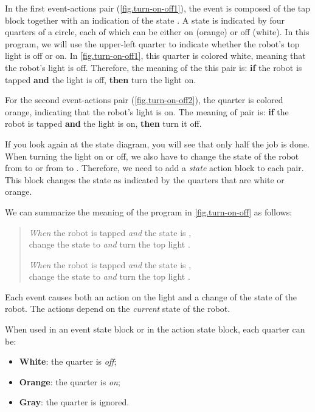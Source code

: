 In the first event-actions pair (\cref{fig.turn-on-off1}), the event is
composed of the tap block together with an indication of the state
. A state is indicated by four quarters of a circle,
each of which can be either on (orange) or off (white). In this program,
we will use the upper-left quarter to indicate whether the robot's top
light is off or on. In \cref{fig.turn-on-off1}, this quarter is colored
white, meaning that the robot's light is off. Therefore, the meaning of
the this pair is: \textbf{if} the robot is tapped \textbf{and} the light
is off, \textbf{then} turn the light on.

For the second event-actions pair (\cref{fig.turn-on-off2}), the quarter
is colored orange, indicating that the robot's light is on. The meaning
of pair is: \textbf{if} the robot is tapped \textbf{and} the light is
on, \textbf{then} turn it off.

If you look again at the state diagram, you will see that only half the
job is done. When turning the light on or off, we also have to change
the state of the robot from  to  or from  to
. Therefore, we need to add a \emph{state} action block
 to each pair. This block changes the state as
indicated by the quarters that are white or orange.

We can summarize the meaning of the program in \cref{fig.turn-on-off}
as follows:

\begin{quote}
\emph{When} the robot is tapped \emph{and} the state is ,\\
change the state to  \emph{and} turn the top light .

\emph{When} the robot is tapped \emph{and} the state is ,\\
change the state to  \emph{and} turn the top light .
\end{quote}

Each event causes both an action on the light and a change of the state
of the robot. The actions depend on the \emph{current} state of the robot.


When used in an event state block or in the action state block, each quarter can be:
\begin{itemize}
\item \textbf{White}: the quarter is \emph{off};
\item \textbf{Orange}: the quarter is \emph{on};
\item \textbf{Gray}: the quarter is ignored.
\end{itemize}

